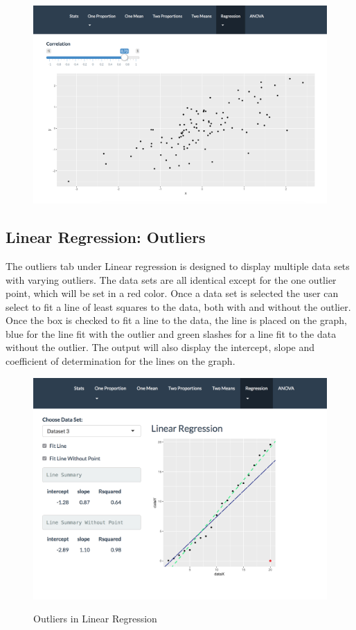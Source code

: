 \documentclass[11pt]{book}
\begin{document}
\begin{figure}[H]
\centering
        \includegraphics[width=\textwidth]{Correlation.png}
        \label{fig:Correlation}
\end{figure}



\subsection{Linear Regression: Outliers}
 
 The outliers tab under Linear regression is designed to display multiple data sets with varying outliers.  The data sets are all identical except for the one outlier point, which will be set in a red color.  Once a data set is selected the user can select to fit a line of least squares to the data, both with and without the outlier.  Once the box is checked to fit a line to the data, the line is placed on the graph, blue for the line fit with the outlier and green slashes for a line fit to the data without the outlier. The output will also display the intercept, slope and coefficient of determination for the lines on the graph.  
 
 \begin{figure}[H]
\centering
        \includegraphics[width=\textwidth]{Outliers.png}
        \label{fig:Outliers}
        \caption{Outliers in Linear Regression}
\end{figure}
\end{document}
